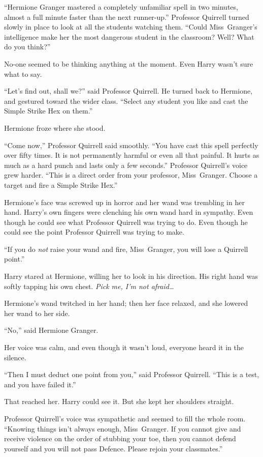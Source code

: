 “Hermione Granger mastered a completely unfamiliar spell in two minutes, almost a full minute faster than the next runner-up.” Professor Quirrell turned slowly in place to look at all the students watching them. “Could Miss~Granger’s intelligence make her the most dangerous student in the classroom? Well? What do you think?”

No-one seemed to be thinking anything at the moment. Even Harry wasn’t sure what to say.

“Let’s find out, shall we?” said Professor Quirrell. He turned back to Hermione, and gestured toward the wider class. “Select any student you like and cast the Simple Strike Hex on them.”

Hermione froze where she stood.

“Come now,” Professor Quirrell said smoothly. “You have cast this spell perfectly over fifty times. It is not permanently harmful or even all that painful. It hurts as much as a hard punch and lasts only a few seconds.” Professor Quirrell’s voice grew harder. “This is a direct order from your professor, Miss~Granger. Choose a target and fire a Simple Strike Hex.”

Hermione’s face was screwed up in horror and her wand was trembling in her hand. Harry’s own fingers were clenching his own wand hard in sympathy. Even though he could see what Professor Quirrell was trying to do. Even though he could see the point Professor Quirrell was trying to make.

“If you do \emph{not} raise your wand and fire, Miss~Granger, you will lose a Quirrell point.”

Harry stared at Hermione, willing her to look in his direction. His right hand was softly tapping his own chest. \emph{Pick me, I’m not afraid…}

Hermione’s wand twitched in her hand; then her face relaxed, and she lowered her wand to her side.

“No,” said Hermione Granger.

Her voice was calm, and even though it wasn’t loud, everyone heard it in the silence.

“Then I must deduct one point from you,” said Professor Quirrell. “This is a test, and you have failed it.”

That reached her. Harry could see it. But she kept her shoulders straight.

Professor Quirrell’s voice was sympathetic and seemed to fill the whole room. “Knowing things isn’t always enough, Miss~Granger. If you cannot give and receive violence on the order of stubbing your toe, then you cannot defend yourself and you will not pass Defence. Please rejoin your classmates.”

